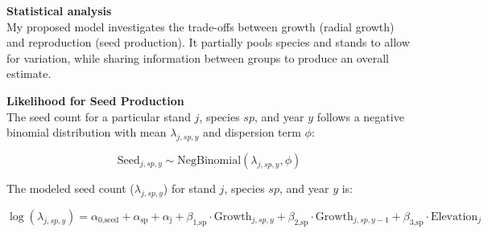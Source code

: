 \documentclass[11pt,letter]{article}
\begin{document}
\textbf{Statistical analysis}\\
My proposed model investigates the trade-offs between growth (radial growth) and reproduction (seed production). It partially pools species and stands to allow for variation, while sharing information between groups to produce an overall estimate.\par

\textbf{Likelihood for Seed Production}\\

The seed count for a particular stand \(j\), species \(sp\), and year \(y\) follows a negative binomial distribution with mean \(\lambda_{j,sp,y}\) and dispersion term \(\phi\):

\[
\text{Seed}_{j,sp,y} \sim \text{NegBinomial}(\lambda_{j,sp,y}, \phi)
\]

The modeled seed count (\(\lambda_{j,sp,y}\)) for stand \(j\), species \(sp\), and year \(y\) is:

\[
\log(\lambda_{j, sp, y}) =\alpha_{\text{0,seed}} + \alpha_{\text{sp}} + \alpha_{\text{j}} + \beta_{\text{1,sp}} \cdot \text{Growth}_{j,sp,y} + \beta_{\text{2,sp}} \cdot \text{Growth}_{j,sp,y-1} + \beta_{\text{3,sp}} \cdot \text{Elevation}_{j}
\]
\end{document}
